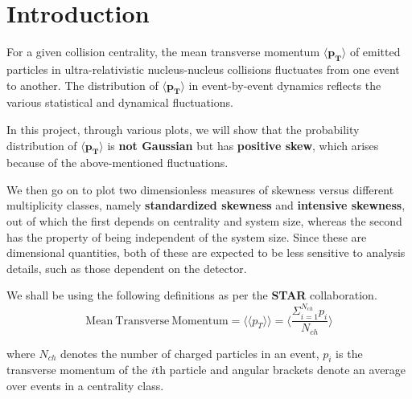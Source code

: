 \documentclass[letterpaper,aps,prc,superscriptaddress,nofootinbib,10pt,showpacs,floatfix]{revtex4-2}
\newcommand{\bfrac}[2]{\frac{\displaystyle #1}{\displaystyle #2}}
\begin{document}
\section{Introduction}
\vspace{-2mm}
For a given collision centrality, the mean transverse momentum $\mathbf{\langle  p_T\rangle}$ of emitted particles in ultra-relativistic nucleus-nucleus collisions fluctuates from one event to another. The distribution of $\mathbf{\langle  p_T\rangle}$ in event-by-event dynamics reflects the various statistical and dynamical fluctuations.
 
In this project, through various plots, we will show that the probability distribution of $\mathbf{\langle  p_T\rangle}$ is \textbf{not Gaussian} but has \textbf{positive skew}, which arises because of the above-mentioned fluctuations.

We then go on to plot two dimensionless measures of skewness versus different multiplicity classes, namely \textbf{standardized skewness} and \textbf{intensive skewness}, out of which the first depends on centrality and system size, whereas the second has the property of being independent of the system size. Since these are dimensional quantities, both of these are expected to be less sensitive to analysis details,
such as those dependent on the detector.

We shall be using the following definitions as per the \textbf{STAR} collaboration.
\vspace{-1mm}
\begin{equation}
\label{eq:1}
\mathrm{Mean\ Transverse\ Momentum}=\langle \langle p_T\rangle \rangle =\langle \bfrac{\Sigma_{i=1}^{N_{ch}} p_i}{N_{ch}}\rangle 
\end{equation}

where $N_{ch}$ denotes the number of charged particles in an event, $p_i$ is the transverse momentum of the $i$th particle and angular brackets denote an average over events in a centrality class.
\end{document}
